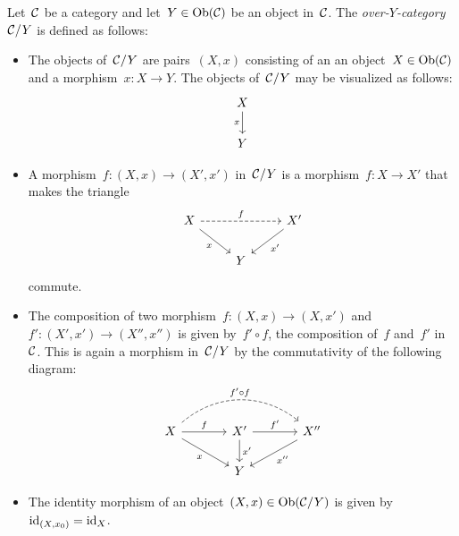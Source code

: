 \begin{remark*}
  Let~$\mathcal{C}$ be a category and let~$Y \in \operatorname{Ob}(\mathcal{C})$ be an object in~$\mathcal{C}$.
  The \emph{over\nobreakdash-$Y$\nobreakdash-category}~$\mathcal{C}/Y$ is defined as follows:
  \begin{itemize}
    \item
      The objects of~$\mathcal{C}/Y$ are pairs~$(X,x)$ consisting of an an object~$X \in \operatorname{Ob}(\mathcal{C})$ and a morphism~$x \colon X \to Y$.
      The objects of~$\mathcal{C}/Y$ may be visualized as follows:
      \[
        \begin{tikzcd}
            X
            \arrow{d}[left]{x}
          \\
            Y
        \end{tikzcd}
      \]
    \item
      A morphism~$f \colon (X,x) \to (X',x')$ in~$\mathcal{C}/Y$ is a morphism~$f \colon X \to X'$ that makes the triangle
      \[
        \begin{tikzcd}
            X
            \arrow[dashed]{rr}[above]{f}
            \arrow{dr}[below left]{x}
          & {}
          & X'
            \arrow{dl}[below right]{x'}
          \\
            {}
          & Y
          & {}
        \end{tikzcd}
      \]
      commute.
    \item
      The composition of two morphism~$f \colon (X,x) \to (X,x')$ and~$f' \colon (X',x') \to (X'',x'')$ is given by~$f' \circ f$, the composition of~$f$ and~$f'$ in~$\mathcal{C}$.
      This is again a morphism in~$\mathcal{C}/Y$ by the commutativity of the following diagram:
      \[
        \begin{tikzcd}[column sep = large]
            X
            \arrow[dashed,bend left = 40]{rr}{f' \circ f}
            \arrow{r}[above]{f}
            \arrow{dr}[below left]{x}
          & X'
            \arrow{r}[above]{f'}
            \arrow{d}[right]{x'}
          & X''
            \arrow{dl}[below right]{x''}
          \\
            {}
          & Y
          & {}
        \end{tikzcd}
      \]
    \item
      The identity morphism of an object~$(X,x) \in \operatorname{Ob}(\mathcal{C}/Y)$ is given by~$\operatorname{id}_{(X,x_0)} = \operatorname{id}_X$.
  \end{itemize}
  

\end{remark*}
